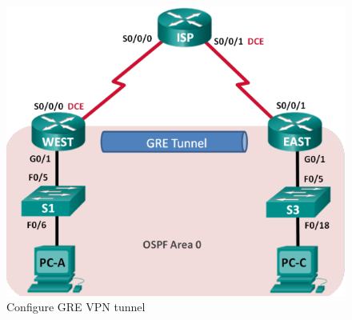 \begin{figure}[hbtp]
\caption{Configure GRE VPN tunnel}\label{GREexample}
\centering
\includegraphics[scale=0.5]{pictures/GREexample.PNG}
\end{figure}

